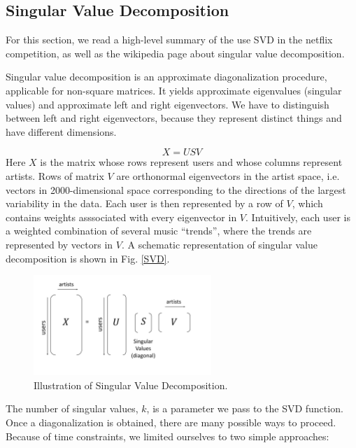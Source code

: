\documentclass[11pt]{article}
\begin{document}
\subsection{Singular Value Decomposition}
For this section, we read a high-level summary of the use SVD in the netflix competition\cite{SVD}, as well as the wikipedia page about singular value decomposition. 

Singular value decomposition is an approximate diagonalization procedure, applicable for non-square matrices. It yields approximate eigenvalues (singular values) and approximate left and right eigenvectors. We have to distinguish between left and right eigenvectors, because they represent distinct things and have different dimensions. 

\begin{equation}
X = USV
\end{equation}
Here $X$ is the matrix whose rows represent users and whose columns represent artists. Rows of matrix $V$ are orthonormal eigenvectors in the artist space, i.e. vectors in 2000-dimensional space corresponding to the directions of the largest variability in the data. Each user is then represented by a row of $V$, which contains weights asssociated with every eigenvector in $V$. Intuitively, each user is a weighted combination of several music ``trends'', where the trends are represented by vectors in $V$. A schematic representation of singular value decomposition is shown in Fig. \ref{SVD}.
\begin{figure}[] 
\centering
        \includegraphics[width=0.6\textwidth]{Plots/SVD.pdf}
        \caption{Illustration of Singular Value Decomposition.}
            \label{fig:SVD}
\end{figure}

The number of singular values, $k$, is a parameter we pass to the SVD function. Once a diagonalization is obtained, there are many possible ways to proceed. Because of time constraints, we limited ourselves to two simple approaches:
\end{document}
